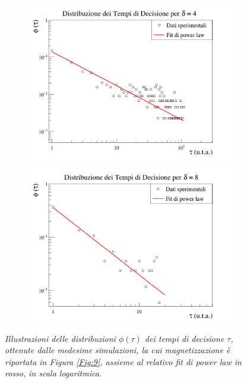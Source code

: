 \documentclass[letterpaper,10pt]{article}
\begin{document}
\begin{figure}
\ContinuedFloat
\centering
\begin{subfigure}{0.8\textwidth}
\includegraphics[width=\linewidth]{time_graph_d4.png}
\end{subfigure}
\begin{subfigure}{0.8\textwidth}
\includegraphics[width=\linewidth]{time_graph_d8.png}
\end{subfigure}
\caption{\textit{Illustrazioni delle distribuzioni $\phi(\tau)$ dei tempi di decisione $\tau$, ottenute dalle medesime simulazioni, la cui magnetizzazione è riportata in Figura \ref{Fig:9}, assieme al relativo fit di power law in rosso, in scala logaritmica.  }}
\label{Fig:10}
\end{figure}
\end{document}
